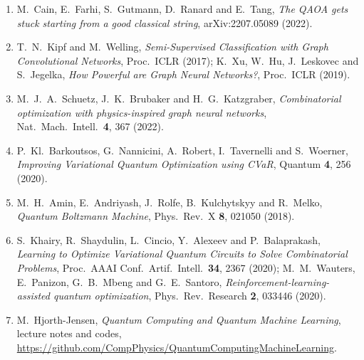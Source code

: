 \documentclass[12pt,a4paper]{article}
\begin{document}
\begin{enumerate}
    \item M.~Cain, E.~Farhi, S.~Gutmann, D.~Ranard and E.~Tang, \textit{The QAOA gets stuck starting from a good classical string}, arXiv:2207.05089 (2022).
    \item T.~N.~Kipf and M.~Welling, \textit{Semi-Supervised Classification with Graph Convolutional Networks}, Proc.\ ICLR (2017); K.~Xu, W.~Hu, J.~Leskovec and S.~Jegelka, \textit{How Powerful are Graph Neural Networks?}, Proc.\ ICLR (2019).
    \item M.~J.~A.~Schuetz, J.~K.~Brubaker and H.~G.~Katzgraber, \textit{Combinatorial optimization with physics-inspired graph neural networks}, Nat.\ Mach.\ Intell.\ \textbf{4}, 367 (2022).
    \item P.~Kl.~Barkoutsos, G.~Nannicini, A.~Robert, I.~Tavernelli and S.~Woerner, \textit{Improving Variational Quantum Optimization using CVaR}, Quantum \textbf{4}, 256 (2020).
    \item M.~H.~Amin, E.~Andriyash, J.~Rolfe, B.~Kulchytskyy and R.~Melko, \textit{Quantum Boltzmann Machine}, Phys.\ Rev.\ X \textbf{8}, 021050 (2018).
    \item S.~Khairy, R.~Shaydulin, L.~Cincio, Y.~Alexeev and P.~Balaprakash, \textit{Learning to Optimize Variational Quantum Circuits to Solve Combinatorial Problems}, Proc.\ AAAI Conf.\ Artif.\ Intell.\ \textbf{34}, 2367 (2020); M.~M.~Wauters, E.~Panizon, G.~B.~Mbeng and G.~E.~Santoro, \textit{Reinforcement-learning-assisted quantum optimization}, Phys.\ Rev.\ Research \textbf{2}, 033446 (2020).
    \item M.~Hjorth-Jensen, \textit{Quantum Computing and Quantum Machine Learning}, lecture notes and codes,\\ \url{https://github.com/CompPhysics/QuantumComputingMachineLearning}.
\end{enumerate}
\end{document}
